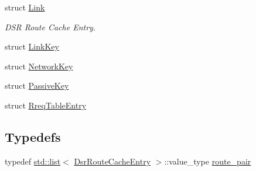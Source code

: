 \begin{DoxyCompactItemize}
struct \hyperlink{structns3_1_1dsr_1_1Link}{Link}
\begin{DoxyCompactList}\small\item\em D\+SR Route Cache Entry. \end{DoxyCompactList}\item 
struct \hyperlink{structns3_1_1dsr_1_1LinkKey}{Link\+Key}
\item 
struct \hyperlink{structns3_1_1dsr_1_1NetworkKey}{Network\+Key}
\item 
struct \hyperlink{structns3_1_1dsr_1_1PassiveKey}{Passive\+Key}
\item 
struct \hyperlink{structns3_1_1dsr_1_1RreqTableEntry}{Rreq\+Table\+Entry}
\end{DoxyCompactItemize}
\subsection*{Typedefs}
\begin{DoxyCompactItemize}
\item 
typedef \hyperlink{openflow-interface_8h_afd9bcfa176617760671b67580f536fa7}{std\+::list}$<$ \hyperlink{classns3_1_1dsr_1_1DsrRouteCacheEntry}{Dsr\+Route\+Cache\+Entry} $>$\+::value\+\_\+type \hyperlink{namespacens3_1_1dsr_aef011a0193cb8462ab3c02212b142dc9}{route\+\_\+pair}
\end{DoxyCompactItemize}

